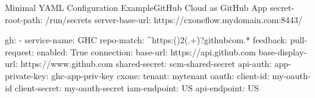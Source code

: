 \begin{code}{Minimal YAML Configuration Example}{GitHub Cloud as GitHub App}{}
secret-root-path: /run/secrets
server-base-url: https://cxoneflow.mydomain.com:8443/

gh:
    - service-name: GHC
      repo-match: ^https:(\/){2}(.+\.)?github\.com.*
      feedback:
        pull-request:
          enabled: True
      connection:
        base-url: https://api.github.com
        base-display-url: https://www.github.com
        shared-secret: scm-shared-secret
        api-auth:
          app-private-key: ghc-app-priv-key
      cxone:
        tenant: mytenant
        oauth:
          client-id: my-oauth-id
          client-secret: my-oauth-secret
        iam-endpoint: US
        api-endpoint: US
\end{code}
  